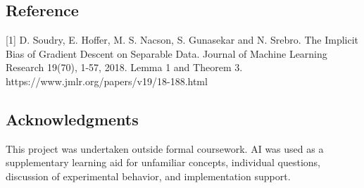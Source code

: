 \documentclass[12pt,a4paper]{article}
\begin{document}
\subsection{Reference}
[1] D. Soudry, E. Hoffer, M. S. Nacson, S. Gunasekar and N. Srebro. The Implicit Bias of Gradient Descent on Separable Data. Journal of Machine Learning Research 19(70), 1-57, 2018. Lemma 1 and Theorem 3. https://www.jmlr.org/papers/v19/18-188.html

\subsection{Acknowledgments}
This project was undertaken outside formal coursework. AI was used as a supplementary learning aid for unfamiliar concepts, individual questions, discussion of experimental behavior, and implementation support.

\FloatBarrier
\end{document}
